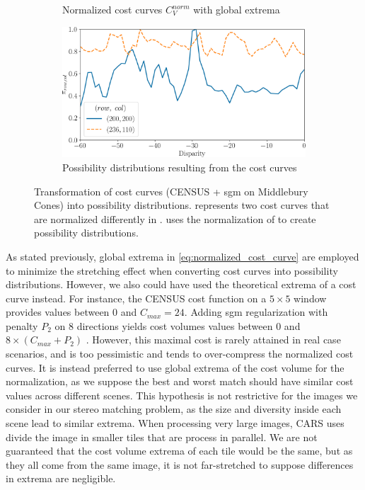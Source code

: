 \begin{figure}
\begin{subfigure}[t]{0.47\linewidth}
        \caption{Normalized cost curves $C_V^{norm}$ with global extrema}
        \label{fig:cost_curves_c}
    \end{subfigure}\hfill
    \begin{subfigure}[t]{0.47\linewidth}
        \centering
        \includegraphics[width=\linewidth]{Images/Chap_5/cost_curve_possibility_distribution.png}
        \caption{Possibility distributions resulting from the cost curves}
        \label{fig:cost_curves_d}
    \end{subfigure}\hfill
    \caption{Transformation of cost curves (CENSUS + \acrshort{sgm} on Middlebury Cones) into possibility distributions.  represents two cost curves that are normalized differently in .  uses the normalization of  to create possibility distributions.}
    \label{fig:cost_curves_to_possibility}
\end{figure}

As stated previously, global extrema in \cref{eq:normalized_cost_curve} are employed to minimize the stretching effect when converting cost curves into possibility distributions. However, we also could have used the theoretical extrema of a cost curve instead. For instance, the CENSUS cost function on a $5\times5$ window provides values between $0$ and $C_{max}=24$. Adding \acrshort{sgm} regularization with penalty $P_2$ on $8$ directions yields cost volumes values between $0$ and $8\times(C_{max}+P_2)$ \cite{hirschmuller_accurate_2005}. However, this maximal cost is rarely attained in real case scenarios, and is too pessimistic and tends to over-compress the normalized cost curves. It is instead preferred to use global extrema of the cost volume for the normalization, as we suppose the best and worst match should have similar cost values across different scenes. This hypothesis is not restrictive for the images we consider in our stereo matching problem, as the size and diversity inside each scene lead to similar extrema.  When processing very large images, CARS uses divide the image in smaller tiles that are process in parallel. We are not guaranteed that the cost volume extrema of each tile would be the same, but as they all come from the same image, it is not far-stretched to suppose differences in extrema are negligible. 

